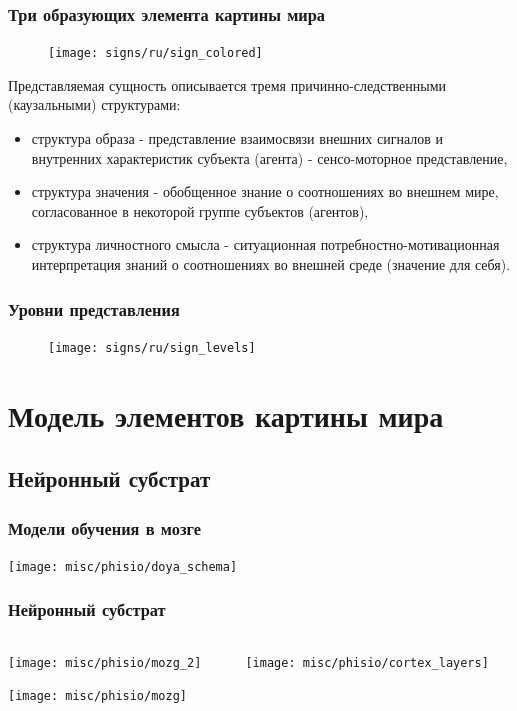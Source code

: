 \documentclass[default]{beamer}
\begin{document}
	\begin{frame}
		\frametitle{Три образующих элемента картины мира}
		\footnotesize
		\begin{figure}
			\texttt{[image: signs/ru/sign\_colored]}
		\end{figure}
		
		Представляемая сущность описывается тремя причинно-следственными (каузальными) структурами:
		\begin{itemize}
			\item {\color{red}структура образа} - представление взаимосвязи внешних сигналов и внутренних характеристик субъекта (агента) - сенсо-моторное представление,
			\item {\color{blue}структура значения} - обобщенное знание о соотношениях во внешнем мире, согласованное в некоторой группе субъектов (агентов),
			\item {\color{green!60!black}структура личностного смысла} - ситуационная потребностно-мотивационная интерпретация знаний о соотношениях во внешней среде (значение для себя).
		\end{itemize}
	\end{frame}

	\begin{frame}
		\frametitle{Уровни представления}
		\begin{figure}
			\texttt{[image: signs/ru/sign\_levels]}
		\end{figure}
	\end{frame}

	\section{Модель элементов картины мира}
	\subsection{Нейронный субстрат}

	\begin{frame}
		\frametitle{Модели обучения в мозге}
		
		\begin{center}
			\texttt{[image: misc/phisio/doya\_schema]}
		\end{center}
		\vfill
		\nocite{*}
		\printbibliography[keyword={doya}, resetnumbers=true]
	\end{frame}	

	\begin{frame}
		\frametitle{Нейронный субстрат}
		
		\begin{columns}
			\begin{column}{0.35\textwidth}
				\texttt{[image: misc/phisio/mozg\_2]}
				\par\bigskip
				\hspace{-7mm}\texttt{[image: misc/phisio/mozg]}
			\end{column}
			\begin{column}{0.65\textwidth}
				\texttt{[image: misc/phisio/cortex\_layers]}
			\end{column}
		\end{columns}
		\nocite{*}
		\printbibliography[keyword={column}, resetnumbers=true]
	\end{frame}
\end{document}
